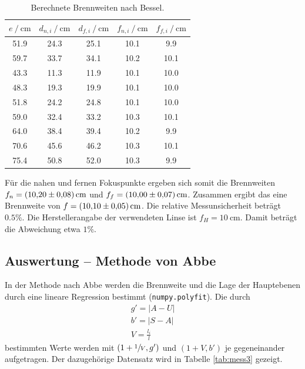 \begin{table}
    \centering
    \caption{Berechnete Brennweiten nach Bessel.}
    \begin{tabular}{c c c c c}
        \toprule
        {$e \:/\: \si{\centi\meter}$} & {$d_{n,i} \:/\: \si{\centi\meter}$} & {$d_{f,i} \:/\: \si{\centi\meter}$} & {$f_{n,i} \:/\: \si{\centi\meter}$} & {$f_{f,i} \:/\: \si{\centi\meter}$} \\
        \midrule
        51.9 &	24.3 &	25.1 &	10.1 &	9.9   \\
        59.7 &	33.7 &	34.1 &	10.2 &	10.1  \\
        43.3 &	11.3 &	11.9 &	10.1 &	10.0  \\
        48.3 &	19.3 &	19.9 &	10.1 &	10.0  \\
        51.8 &	24.2 &	24.8 &	10.1 &	10.0  \\
        59.0 &	32.4 &	33.2 &	10.3 &	10.1  \\
        64.0 &	38.4 &	39.4 &	10.2 &	9.9   \\
        70.6 &	45.6 &	46.2 &	10.3 &	10.1  \\
        75.4 &	50.8 &	52.0 &	10.3 &	9.9   \\
    \end{tabular}
    \label{tab:bessel}
\end{table}
Für die nahen und fernen Fokuspunkte ergeben sich somit die Brennweiten $f_n = \SI{10.20\pm0.08}{\centi\meter}$ und $f_f = \SI{10.00\pm0.07}{\centi\meter}$.
Zusammen ergibt das eine Brennweite von $f = \SI{10.10\pm0.05}{\centi\meter}$. Die relative Messunsicherheit beträgt $0.5\%$.
Die Herstellerangabe der verwendeten Linse ist $f_H = \SI{10}{\centi\meter}$. Damit beträgt die Abweichung etwa $1\%$.

\subsection{Auswertung -- Methode von Abbe}
In der Methode nach Abbe werden die Brennweite und die Lage der Hauptebenen durch eine lineare Regression bestimmt (\texttt{numpy.polyfit}\cite{numpy}). Die durch 
\begin{equation}
    \begin{gathered}
        g' = |A - U|    \\
        b' = |S - A|    \\
        V = \frac{l_i}{l}
    \end{gathered}
\end{equation}
bestimmten Werte werden mit $(1+\sfrac{1}{V},g')$ und $(1+V,b')$ je gegeneinander aufgetragen. Der dazugehörige Datensatz wird in Tabelle \ref{tab:mess3} gezeigt.

